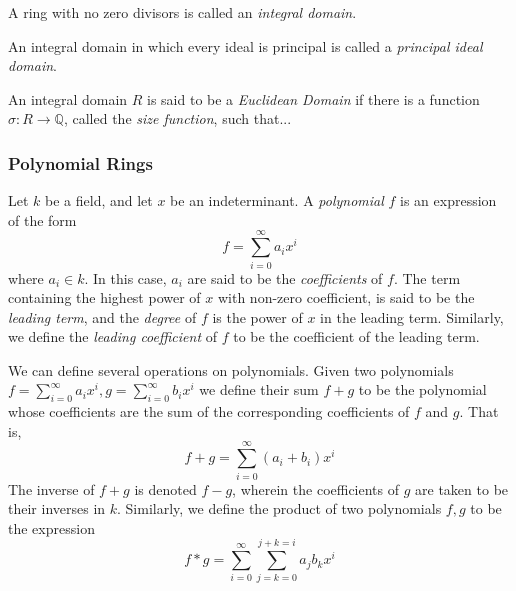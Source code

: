 \begin{definition}
  A ring with no zero divisors is called an \emph{integral domain}.
\end{definition}

\begin{definition}
  An integral domain in which every ideal is principal is called a \emph{principal ideal domain}.
\end{definition}

\begin{definition}
  An integral domain $R$ is said to be a \emph{Euclidean Domain} if there is a function $\sigma: R \to \mathbb{Q}$, called the \emph{size function}, such that...
\end{definition}

\subsubsection{Polynomial Rings}

\begin{definition}
  Let $k$ be a field, and let $x$ be an indeterminant. A \emph{polynomial} $f$ is an expression of the form
  \begin{equation*}
  f = \sum_{i = 0}^\infty a_ix^i
  \end{equation*}
  where $a_i \in k$. In this case, $a_i$ are said to be the \emph{coefficients} of $f$. The term containing the highest power of $x$ with non-zero coefficient, is said to be the \emph{leading term}, and the \emph{degree} of $f$ is the power of $x$ in the leading term. Similarly, we define the \emph{leading coefficient} of $f$ to be the coefficient of the leading term.
\end{definition}

We can define several operations on polynomials. Given two polynomials $f = \sum_{i = 0}^\infty a_ix^i, g = \sum_{i = 0}^\infty b_ix^i$ we define their sum $f + g$ to be the polynomial whose coefficients are the sum of the corresponding coefficients of $f$ and $g$. That is,
\begin{equation*}
  f + g = \sum_{i = 0}^\infty (a_i + b_i)x^i
\end{equation*}
The inverse of $f + g$ is denoted $f - g$, wherein the coefficients of $g$ are taken to be their inverses in $k$. Similarly, we define the product of two polynomials $f, g$ to be the expression
\begin{equation*}
  f * g = \sum_{i = 0}^\infty \sum_{j = k = 0}^{j + k = i} a_jb_k x^i
\end{equation*}

